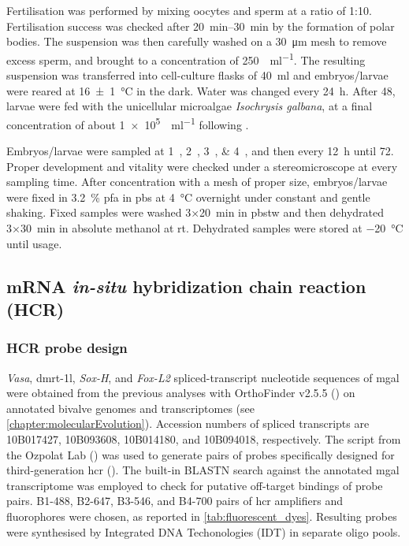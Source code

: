 Fertilisation was performed by mixing oocytes and sperm at a ratio of 1:10. Fertilisation success was checked after \qtyrange{20}{30}{\minute} by the formation of polar bodies. The suspension was then carefully washed on a \qty{30}{\um} mesh to remove excess sperm, and brought to a concentration of \qty{250}{\zygotes\per\ml}. The resulting suspension was transferred into cell-culture flasks of \qty{40}{\ml} and embryos/larvae were reared at \qty{16(1)}{\degreeCelsius} in the dark. Water was changed every \qty{24}{\hour}. After \qty{48}{\hpf}, larvae were fed with the unicellular microalgae \textit{Isochrysis galbana}, at a final concentration of about \qty{1e5}{\cells\per\ml} following .

Embryos/larvae were sampled at \qtylist{1;2;3;4}{\hpf}, and then every \qty{12}{\hour} until \qty{72}{\hpf}. Proper development and vitality were checked under a stereomicroscope at every sampling time. After concentration with a mesh of proper size, embryos/larvae were fixed in \qty{3.2}{\percent} \gls{pfa} in \gls{pbs} at \qty{4}{\degreeCelsius} overnight under constant and gentle shaking. Fixed samples were washed 3×\qty{20}{min} in \gls{pbstw} and then dehydrated 3×\qty{30}{\minute} in absolute methanol at \gls{rt}. Dehydrated samples were stored at \qty{-20}{\degreeCelsius} until usage.

\subsection{mRNA \textit{in-situ} hybridization chain reaction (HCR)}
\subsubsection{HCR probe design}
\textit{Vasa}, \gls{dmrt-1l}, \textit{Sox-H}, and \textit{Fox-L2} spliced-transcript nucleotide sequences of \gls{mgal} were obtained from the previous analyses with OrthoFinder v2.5.5 () on annotated bivalve genomes and transcriptomes (see \cref{chapter:molecularEvolution}). Accession numbers of spliced transcripts are 10B017427, 10B093608, 10B014180, and 10B094018, respectively. The  script from the Ozpolat Lab () was used to generate pairs of probes specifically designed for third-generation \gls{hcr} (). The built-in BLASTN search against the annotated \gls{mgal} transcriptome was employed to check for putative off-target bindings of probe pairs. B1-488, B2-647, B3-546, and B4-700 pairs of \gls{hcr} amplifiers and fluorophores were chosen, as reported in \cref{tab:fluorescent_dyes}. Resulting probes were synthesised by Integrated DNA Techonologies (IDT\texttrademark) in separate oligo pools.

